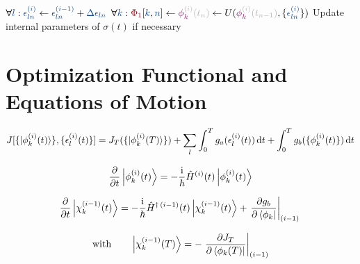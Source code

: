 \documentclass[aps,pra,twocolumn,notitlepage,letterpaper]{revtex4}
\newcommand{\Op}[1]{\hat{#1}}
\newcommand{\dd}[0]{\,\text{d}}
\newcommand{\VarScalar}[1]{{\color{clVarScalar}#1}}
\newcommand{\VarState}[1]{\ensuremath{\textcolor{clVarState}{#1}}}
\newcommand{\PropAnnotation}[1]{\textcolor{black!30}{#1}}
\newcommand{\VarPropState}[4]{\ensuremath{\VarState{#1}_{\textcolor{clVarState}{#2}}^{\PropAnnotation{#3}}\PropAnnotation{(#4)}}}  %
\newcommand{\VarArray}[1]{{\color{clVarArray}#1}}
\newcommand{\Forall}{\boldsymbol{\forall}}
\begin{document}
\begin{algorithm}
\begin{algorithmic}[1]
         \EndIf
         \State $\Forall \VarScalar{l}: \VarScalar{\epsilon_{ln}^{(i)}} \gets \VarScalar{\epsilon_{ln}^{(i-1)}} + \VarScalar{\Delta \epsilon_{ln}}$ 
         \State $\Forall \VarScalar{k}: \VarArray{\Phi_1}[\VarScalar{k},\VarScalar{n}] \gets \VarPropState{\phi}{k}{(i)}{t_n} \gets U(\VarPropState{\phi}{k}{(i)}{t_{n-1}}, \{\VarScalar{\epsilon_{ln}^{(i)}}\})$  \label{ln:prop3}
      \EndFor
        \State Update internal parameters of $\sigma(t)$ \label{ln:sigma_update} if necessary
      \EndIf
    \EndProcedure
  \end{algorithmic}
\end{algorithm}


\section*{Optimization Functional and Equations of Motion}

\vspace{-5mm}
\begin{equation}
  \label{eq:functional}
  J[\{\ket{\phi_k^{(i)}(t)}\}, \{\epsilon_l^{(i)}(t)\}]
    = J_T(\{\ket{\phi_k^{(i)}(T)}\})
        + \sum_l \int_0^T g_a(\epsilon_l^{(i)}(t)) \dd t
        + \int_0^T g_b(\{\phi^{(i)}_k(t)\}) \dd t
\end{equation}

\begin{equation}%
  \label{eq:fw_eqm}
  \frac{\partial}{\partial t} \Ket{\phi_k^{(i)}(t)} =
  -\frac{\mathrm{i}}{\hbar} \Op{H}^{(i)}(t) \Ket{\phi_k^{(i)}(t)}
\end{equation}

\begin{equation}%
  \label{eq:bw_eqm}
  \frac{\partial}{\partial t} \Ket{\chi_k^{(i-1)}(t)}
  = -\frac{\mathrm{i}}{\hbar} \Op{H}^{\dagger\,(i-1)}(t) \Ket{\chi_k^{(i-1)}(t)}
    + \left.\frac{\partial g_b}{\partial \Bra{\phi_k}}\right\vert_{(i-1)}\,
\end{equation}

\vspace{-3mm}
\begin{equation}%
  \label{eq:chi_boundary}
  \text{with}\qquad
  \Ket{\chi_k^{(i-1)}(T)}
  = - \left.\frac{\partial J_T}{\partial \Bra{\phi_k(T)}}
    \right\vert_{(i-1)}
\end{equation}
\end{document}
